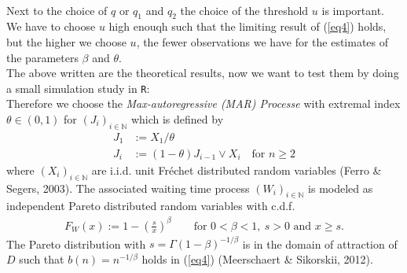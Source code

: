 \documentclass[10pt, a4paper]{article}\usepackage[]{graphicx}\usepackage[]{color}
\renewcommand{\ge}{\geqslant}
\begin{document}
\\
Next to the choice of $q$ or $q_1$ and $q_2$ the choice of the threshold $u$ is important. We have to choose $u$ high enouqh such that the limiting result of (\ref{eq4}) holds, but the higher we choose $u$, the fewer observations we have for the estimates of the parameters $\beta$ and $\theta$.
\\
The above written are the theoretical results, now we want to test them by doing a small simulation study in \texttt{R}:
\\
Therefore we choose the \emph{Max-autoregressive (MAR) Processe} with extremal index $\theta \in (0,1)$ for $(J_i)_{i \in \mathbb{N}}$ which is defined by
\begin{align}
J_1&:=X_1/\theta \\
J_i&:=(1-\theta) J_{i-1} \vee X_i \quad \text{for \ } n \ge 2
\end{align}
where $(X_i)_{i \in \mathbb{N}}$ are i.i.d. unit Fr{\'e}chet distributed random variables (Ferro \& Segers, 2003).
The associated waiting time process $(W_i)_{i \in \mathbb{N}}$ is modeled as independent Pareto distributed random variables with c.d.f.
\begin{align}
	F_W(x):=1-\left(\frac{s}{x}\right)^{\beta} \qquad \text{for } 0<\beta<1, \ s>0 \text{ and } x\ge s.
\end{align}
The Pareto distribution with $s=\Gamma(1-\beta)^{-1/\beta}$ is in the domain of attraction of $D$ such that $b(n)=n^{-1/\beta}$ holds in (\ref{eq4}) (Meerschaert \& Sikorskii, 2012).
\end{document}
